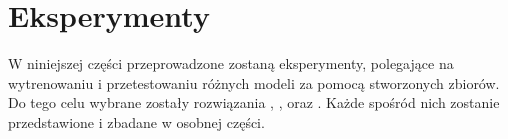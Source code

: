 \chapter{Eksperymenty}

W niniejszej części przeprowadzone zostaną eksperymenty, polegające na wytrenowaniu i przetestowaniu różnych modeli za pomocą stworzonych zbiorów. Do tego celu wybrane zostały rozwiązania , ,  oraz . Każde spośród nich zostanie przedstawione i zbadane w osobnej części.









